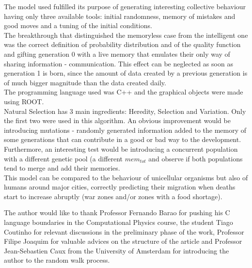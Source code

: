 \documentclass[a4paper,prd,twocolumn,nofootinbib,superscriptaddress,floatfix]{revtex4}
\begin{document}
The model used fulfilled its purpose of generating interesting collective behaviour having only three available tools: initial randomness, memory of mistakes and good moves and a tuning of the initial conditions.\\
The breakthrough that distinguished the memoryless case from the intelligent one  was the correct definition of probability distribution and of the quality function and gifting generation 0 with a live memory that emulates their only way of sharing information - communication. This effect can be neglected as soon as generation 1 is born, since the amount of data created by a previous generation is of much bigger magnitude than the data created daily.\\
The programming language used was C++ and the graphical objects were made using ROOT.\\
Natural Selection has 3 main ingredients: Heredity, Selection and Variation. Only the first two were used in this algorithm. An obvious improvement would be introducing mutations - randomly generated information added to the memory of some generations that can contribute in a good or bad way to the development.\\
Furthermore, an interesting test would be introducing a concurrent population with a different genetic pool (a different $mem_{tot}$ and observe if both populations tend to merge and add their memories.\\
This model can be compared to the behaviour of unicellular organisms but also of humans around major cities, correctly predicting their migration when deaths start to increase abruptly (war zones and/or zones with a food shortage).
\vspace{-6mm}
\acknowledgements

The author would like to thank Professor Fernando Barao for pushing his C language boundaries in the Computational Physics course, the student Tiago Coutinho for relevant discussions in the preliminary phase of the work, Professor Filipe Joaquim for valuable advices on the structure of the article and Professor Jean-Sebastien Caux from the University of Amsterdam for introducing the author to the random walk process.
\end{document}
